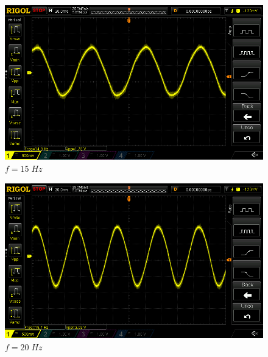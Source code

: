 \documentclass[uplatex,a4paper,11pt,oneside,openany]{jsbook}
\begin{document}
\begin{spacing}{0.67}
  \begin{multicols}{2}
    \begin{figure}[H]
       \centering
        \includegraphics[keepaspectratio, scale=0.28, angle=0]
                    {rigol/figs/FrqCharM1Y1_2kR/15hz.png}
                    \caption{$f=15\;Hz$}
                    \label{fig:frq15}
    \end{figure}
  
    \begin{figure}[H]
       \centering
        \includegraphics[keepaspectratio, scale=0.28, angle=0]
                  {rigol/figs/FrqCharM1Y1_2kR/20hz.png}
                  \caption{$f=20\;Hz$}
                  \label{fig:frq20}
    \end{figure}
  \end{multicols}


\end{spacing}
\end{document}
